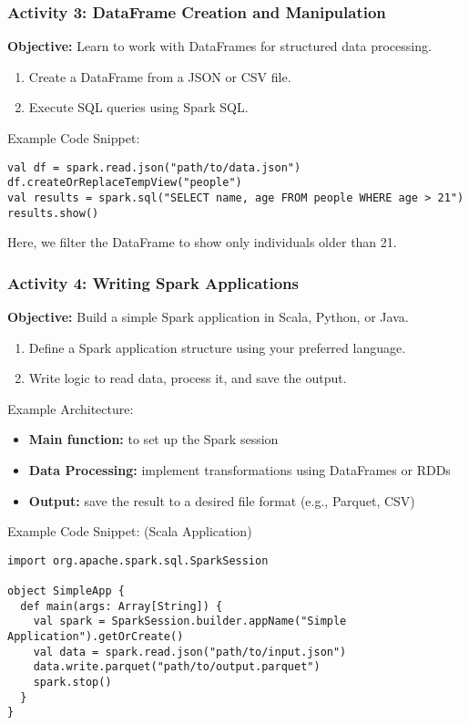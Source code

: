 \documentclass[aspectratio=169]{beamer}
\begin{document}
\begin{frame}[fragile]
    \frametitle{Activity 3: DataFrame Creation and Manipulation}
    \textbf{Objective:} Learn to work with DataFrames for structured data processing.

    \begin{enumerate}
        \item Create a DataFrame from a JSON or CSV file.
        \item Execute SQL queries using Spark SQL.
    \end{enumerate}

    \begin{block}{Example Code Snippet:}
        \begin{lstlisting}
val df = spark.read.json("path/to/data.json")
df.createOrReplaceTempView("people")
val results = spark.sql("SELECT name, age FROM people WHERE age > 21")
results.show()
        \end{lstlisting}
    Here, we filter the DataFrame to show only individuals older than 21.
    \end{block}
\end{frame}

\begin{frame}[fragile]
    \frametitle{Activity 4: Writing Spark Applications}
    \textbf{Objective:} Build a simple Spark application in Scala, Python, or Java.

    \begin{enumerate}
        \item Define a Spark application structure using your preferred language.
        \item Write logic to read data, process it, and save the output.
    \end{enumerate}

    \begin{block}{Example Architecture:}
        \begin{itemize}
            \item \textbf{Main function:} to set up the Spark session
            \item \textbf{Data Processing:} implement transformations using DataFrames or RDDs
            \item \textbf{Output:} save the result to a desired file format (e.g., Parquet, CSV)
        \end{itemize}
    \end{block}

    \begin{block}{Example Code Snippet: (Scala Application)}
        \begin{lstlisting}
import org.apache.spark.sql.SparkSession

object SimpleApp {
  def main(args: Array[String]) {
    val spark = SparkSession.builder.appName("Simple Application").getOrCreate()
    val data = spark.read.json("path/to/input.json")
    data.write.parquet("path/to/output.parquet")
    spark.stop()
  }
}
        \end{lstlisting}
    \end{block}
\end{frame}
\end{document}
